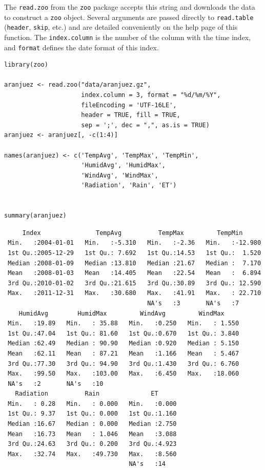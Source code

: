 \documentclass[smallroyalvopaper]{memoir}
\begin{document}
The \texttt{read.zoo} from the \texttt{zoo} package accepts this string and
downloads the data to construct a \texttt{zoo} object. Several
arguments are passed directly to \texttt{read.table} (\texttt{header}, \texttt{skip},
etc.) and are detailed conveniently on the help page of this
function. The \texttt{index.column} is the number of the column with the
time index, and \texttt{format} defines the date format of this index.


\lstset{language=r,label= ,caption= ,captionpos=b,numbers=none}
\begin{lstlisting}
library(zoo)
  
aranjuez <- read.zoo("data/aranjuez.gz",
                     index.column = 3, format = "%d/%m/%Y",
                     fileEncoding = 'UTF-16LE',
                     header = TRUE, fill = TRUE,
                     sep = ';', dec = ",", as.is = TRUE)
aranjuez <- aranjuez[, -c(1:4)]
  
names(aranjuez) <- c('TempAvg', 'TempMax', 'TempMin',
                     'HumidAvg', 'HumidMax',
                     'WindAvg', 'WindMax',
                     'Radiation', 'Rain', 'ET')
  
  
summary(aranjuez)
\end{lstlisting}

\begin{verbatim}
     Index               TempAvg          TempMax         TempMin       
 Min.   :2004-01-01   Min.   :-5.310   Min.   :-2.36   Min.   :-12.980  
 1st Qu.:2005-12-29   1st Qu.: 7.692   1st Qu.:14.53   1st Qu.:  1.520  
 Median :2008-01-09   Median :13.810   Median :21.67   Median :  7.170  
 Mean   :2008-01-03   Mean   :14.405   Mean   :22.54   Mean   :  6.894  
 3rd Qu.:2010-01-02   3rd Qu.:21.615   3rd Qu.:30.89   3rd Qu.: 12.590  
 Max.   :2011-12-31   Max.   :30.680   Max.   :41.91   Max.   : 22.710  
                                       NA's   :3       NA's   :7        
    HumidAvg        HumidMax         WindAvg         WindMax      
 Min.   :19.89   Min.   : 35.88   Min.   :0.250   Min.   : 1.550  
 1st Qu.:47.04   1st Qu.: 81.60   1st Qu.:0.670   1st Qu.: 3.840  
 Median :62.49   Median : 90.90   Median :0.920   Median : 5.150  
 Mean   :62.11   Mean   : 87.21   Mean   :1.166   Mean   : 5.467  
 3rd Qu.:77.30   3rd Qu.: 94.90   3rd Qu.:1.430   3rd Qu.: 6.760  
 Max.   :99.50   Max.   :103.00   Max.   :6.450   Max.   :18.060  
 NA's   :2       NA's   :10                                       
   Radiation          Rain              ET       
 Min.   : 0.28   Min.   : 0.000   Min.   :0.000  
 1st Qu.: 9.37   1st Qu.: 0.000   1st Qu.:1.160  
 Median :16.67   Median : 0.000   Median :2.750  
 Mean   :16.73   Mean   : 1.046   Mean   :3.088  
 3rd Qu.:24.63   3rd Qu.: 0.200   3rd Qu.:4.923  
 Max.   :32.74   Max.   :49.730   Max.   :8.560  
                                  NA's   :14
\end{verbatim}
\end{document}
